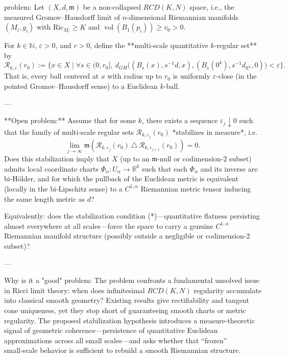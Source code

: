 problem:  
Let \((X, d, \mathfrak{m})\) be a non‑collapsed \(RCD(K,N)\) space, i.e., the measured Gromov–Hausdorff limit of \(n\)-dimensional Riemannian manifolds \((M_i,g_i)\) with \(\mathrm{Ric}_{M_i} \ge K\) and \(\operatorname{vol}(B_1(p_i)) \ge v_0>0\).  

For \(k \in \mathbb{N}\), \(\varepsilon>0\), and \(r>0\), define the **multi‑scale quantitative \(k\)-regular set** by  
\[
\mathcal{R}_{k,\varepsilon}(r_0)
:= 
\Big\{ x\in X \;\Big|\;
\forall s\in(0,r_0], \ 
d_{GH}\big((B_s(x), s^{-1}d,x),(B_s(0^k), s^{-1}d_{\mathbb{R}^k},0)\big)<\varepsilon
\Big\}.
\]
That is, every ball centered at \(x\) with radius up to \(r_0\) is uniformly \(\varepsilon\)-close (in the pointed Gromov–Hausdorff sense) to a Euclidean \(k\)-ball.  

---

**Open problem:**  
Assume that for some \(k\), there exists a sequence \(\varepsilon_j \downarrow 0\) such that the family of multi‑scale regular sets \(\mathcal{R}_{k,\varepsilon_j}(r_0)\) *stabilizes in measure*, i.e.  
\[
\lim_{j\to\infty}
\mathfrak{m}\!\left(\mathcal{R}_{k,\varepsilon_j}(r_0)
\,\triangle\,
\mathcal{R}_{k,\varepsilon_{j+1}}(r_0)\right)=0.
\tag{*}
\]
Does this stabilization imply that \(X\) (up to an \(\mathfrak{m}\)-null or codimension‑2 subset) admits local coordinate charts  
\(\Phi_\alpha: U_\alpha \to \mathbb{R}^k\)  
such that each \(\Phi_\alpha\) and its inverse are bi‑Hölder, and for which the pullback of the Euclidean metric is equivalent (locally in the bi‑Lipschitz sense) to a \(C^{1,\alpha}\) Riemannian metric tensor inducing the same length metric as \(d\)?  

Equivalently: does the stabilization condition (*)—quantitative flatness persisting almost everywhere at all scales—force the space to carry a genuine \(C^{1,\alpha}\) Riemannian manifold structure (possibly outside a negligible or codimension‑2 subset)?

---

Why is it a "good" problem:  
The problem confronts a fundamental unsolved issue in Ricci limit theory: when does infinitesimal \(RCD(K,N)\) regularity accumulate into classical smooth geometry? Existing results give rectifiability and tangent cone uniqueness, yet they stop short of guaranteeing smooth charts or metric regularity. The proposed stabilization hypothesis introduces a measure‑theoretic signal of geometric coherence—persistence of quantitative Euclidean approximations across all small scales—and asks whether that “frozen” small‑scale behavior is sufficient to rebuild a smooth Riemannian structure.

